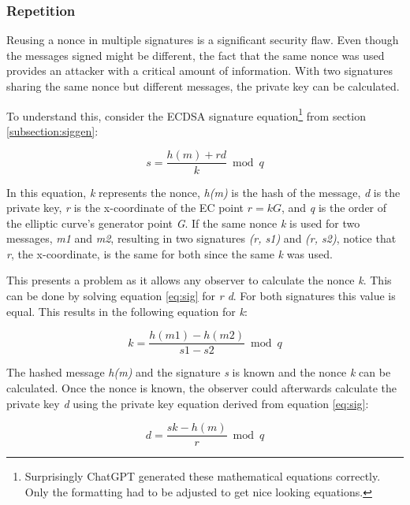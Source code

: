 \subsubsection{Repetition}
\label{subsubsection:repetition}
Reusing a nonce in multiple signatures is a significant security flaw. Even though the messages signed might be different, the fact that the same nonce was used provides an attacker with a critical amount of information. With two signatures sharing the same nonce but different messages, the private key can be calculated. \cite{cryptoeprint:2014/848}

To understand this, consider the ECDSA signature equation\footnote{Surprisingly ChatGPT generated these mathematical equations correctly. Only the formatting had to be adjusted to get nice looking equations.} from section \ref{subsection:siggen}:

\begin{equation} \label{eq:sig}
s = \frac{h(m) + r d}{k} \bmod q
\end{equation}

In this equation, \textit{k} represents the nonce, \textit{h(m)} is the hash of the message, \textit{d} is the private key, \textit{r} is the x-coordinate of the EC point \(r=kG\), and \textit{q} is the order of the elliptic curve's generator point \textit{G}. If the same nonce \textit{k} is used for two messages, \textit{m1} and \textit{m2}, resulting in two signatures \textit{(r, s1)} and \textit{(r, s2)}, notice that \textit{r}, the x-coordinate, is the same for both since the same \textit{k} was used.

This presents a problem as it allows any observer to calculate the nonce \textit{k}. This can be done by solving equation \ref{eq:sig} for \textit{r d}. For both signatures this value is equal. This results in the following equation for \textit{k}:

\begin{equation}
k = \frac{h(m1) - h(m2)}{s1 - s2} \bmod q
\end{equation}

The hashed message \textit{h(m)} and the signature \textit{s} is known and the nonce \textit{k} can be calculated. Once the nonce is known, the observer could afterwards calculate the private key \textit{d} using the private key equation derived from equation \ref{eq:sig}:

\begin{equation} \label{eq:key}
d = \frac{s k - h(m)}{r} \bmod q
\end{equation}

